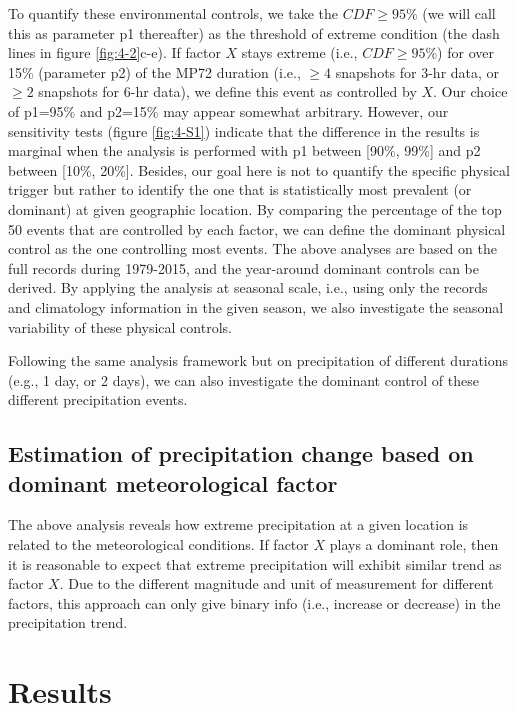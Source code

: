 To quantify these environmental controls, we take the $CDF\geq95\%$ (we will call this as parameter p1 thereafter) as the threshold of extreme condition (the dash lines in figure \ref{fig:4-2}c-e). If factor $X$ stays extreme (i.e., $CDF\geq95\%$) for over 15\% (parameter p2) of the MP72 duration (i.e., $\geq4$ snapshots for 3-hr data, or $\geq2$ snapshots for 6-hr data), we define this event as controlled by $X$. Our choice of p1=95\% and p2=15\% may appear somewhat arbitrary. However, our sensitivity tests (figure \ref{fig:4-S1}) indicate that the difference in the results is marginal when the analysis is performed with p1 between [90\%, 99\%] and p2 between [10\%, 20\%]. Besides, our goal here is not to quantify the specific physical trigger but rather to identify the one that is statistically most prevalent (or dominant) at given geographic location. By comparing the percentage of the top 50 events that are controlled by each factor, we can define the dominant physical control as the one controlling most events. The above analyses are based on the full records during 1979-2015, and the year-around dominant controls can be derived. By applying the analysis at seasonal scale, i.e., using only the records and climatology information in the given season, we also investigate the seasonal variability of these physical controls.

Following the same analysis framework but on precipitation of different durations (e.g., 1 day, or 2 days), we can also investigate the dominant control of these different precipitation events.

\subsection{Estimation of precipitation change based on dominant meteorological factor}

The above analysis reveals how extreme precipitation at a given location is related to the meteorological conditions. If factor $X$ plays a dominant role, then it is reasonable to expect that extreme precipitation will exhibit similar trend as factor $X$. Due to the different magnitude and unit of measurement for different factors, this approach can only give binary info (i.e., increase or decrease) in the precipitation trend.


\section{Results}

